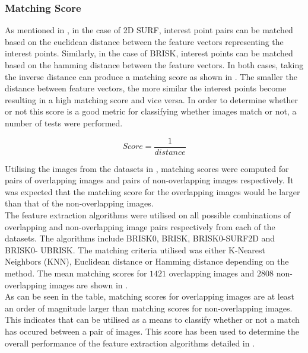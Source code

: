 \documentclass{article}
\begin{document}
\subsubsection{Matching Score}
\label{sec:matchingScore}
As mentioned in , in the case of 2D SURF, interest point pairs can be matched based on the euclidean distance between the feature vectors representing the interest points. Similarly, in the case of BRISK, interest points can be matched based on the hamming distance between the feature vectors. In both cases, taking the inverse distance can produce a matching score as shown in . The smaller the distance between feature vectors, the more similar the interest points become resulting in a high matching score and vice versa. In order to determine whether or not this score is a good metric for classifying whether images match or not, a number of tests were performed.

\begin{equation}
Score = \frac{1}{distance}
\label{eqn:inverseDistance}
\end{equation}

Utilising the images from the datasets in , matching scores were computed for pairs of overlapping images and pairs of non-overlapping images respectively. It was expected that the matching score for the overlapping images would be larger than that of the non-overlapping images. \\

The feature extraction algorithms were utilised on all possible combinations of overlapping and non-overlapping image pairs respectively from each of the datasets. The algorithms include BRISK0, BRISK, BRISK0-SURF2D and BRISK0- UBRISK. The matching criteria utilised was either K-Nearest Neighbors (KNN), Euclidean distance or Hamming distance depending on the method. The mean matching scores for $1421$ overlapping images and $2808$ non-overlapping images are shown in . \\

As can be seen in the table, matching scores for overlapping images are at least an order of magnitude larger than matching scores for non-overlapping images. This indicates that  can be utilised as a means to classify whether or not a match has occured between a pair of images. This score has been used to determine the overall performance of the feature extraction algorithms detailed in .\\
\end{document}
